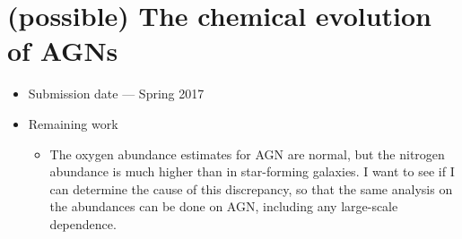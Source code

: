 \documentclass{article}
\begin{document}
\section{(possible) The chemical evolution of AGNs}
\begin{itemize}
    \item Submission date --- Spring 2017
    \item Remaining work
    \begin{itemize}
        \item The oxygen abundance estimates for AGN are normal, but the nitrogen abundance is much higher than in star-forming galaxies.  I want to see if I can determine the cause of this discrepancy, so that the same analysis on the abundances can be done on AGN, including any large-scale dependence.
    \end{itemize}
\end{itemize}
\end{document}
